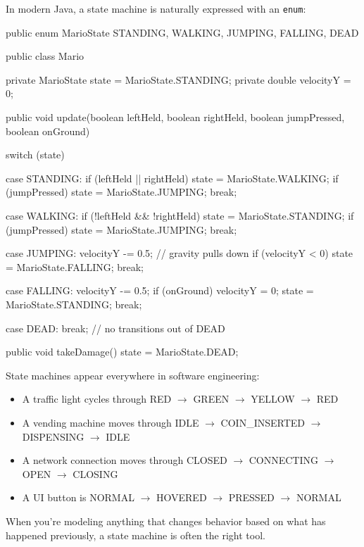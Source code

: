 \documentclass[11pt,letterpaper]{article}
\begin{document}
In modern Java, a state machine is naturally expressed with an \texttt{enum}:

\begin{javacode}
public enum MarioState {
    STANDING, WALKING, JUMPING, FALLING, DEAD
}

public class Mario {
    private MarioState state = MarioState.STANDING;
    private double velocityY = 0;

    public void update(boolean leftHeld, boolean rightHeld,
                       boolean jumpPressed, boolean onGround) {
        switch (state) {
            case STANDING:
                if (leftHeld || rightHeld) state = MarioState.WALKING;
                if (jumpPressed)           state = MarioState.JUMPING;
                break;

            case WALKING:
                if (!leftHeld && !rightHeld) state = MarioState.STANDING;
                if (jumpPressed)             state = MarioState.JUMPING;
                break;

            case JUMPING:
                velocityY -= 0.5;          // gravity pulls down
                if (velocityY < 0)         state = MarioState.FALLING;
                break;

            case FALLING:
                velocityY -= 0.5;
                if (onGround) {
                    velocityY = 0;
                    state = MarioState.STANDING;
                }
                break;

            case DEAD:
                break;                     // no transitions out of DEAD
        }
    }

    public void takeDamage() {
        state = MarioState.DEAD;
    }
}
\end{javacode}

\begin{tipbox}
State machines appear everywhere in software engineering:
\begin{itemize}[itemsep=2pt]
    \item A traffic light cycles through RED $\to$ GREEN $\to$ YELLOW $\to$ RED
    \item A vending machine moves through IDLE $\to$ COIN\_INSERTED $\to$ DISPENSING $\to$ IDLE
    \item A network connection moves through CLOSED $\to$ CONNECTING $\to$ OPEN $\to$ CLOSING
    \item A UI button is NORMAL $\to$ HOVERED $\to$ PRESSED $\to$ NORMAL
\end{itemize}
When you're modeling anything that changes behavior based on what has happened previously, a state machine is often the right tool.
\end{tipbox}
\end{document}
